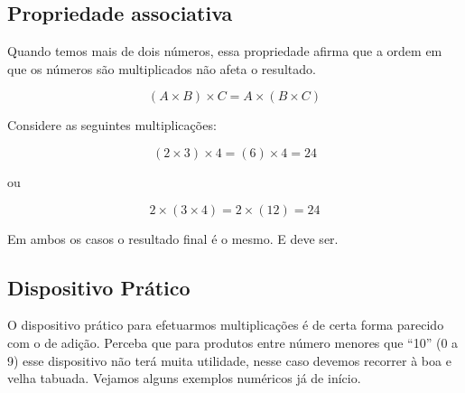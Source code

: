 \subsection{Propriedade associativa}

Quando temos mais de dois números, essa propriedade afirma que a ordem em que os números são multiplicados não afeta o resultado. 

\begin{equation}
    (A\times B)\times C=A \times (B \times C)
\end{equation}

\begin{exemplo}
    Considere as seguintes multiplicações:

    \begin{equation}
        (2\times3)\times4=(6)\times4=24
    \end{equation}
    
    ou
    
    \begin{equation}
        2\times(3\times4)=2\times(12)=24
    \end{equation}

    Em ambos os casos o resultado final é o mesmo. E deve ser.
\end{exemplo}

\subsection{Dispositivo Prático}

O dispositivo prático para efetuarmos multiplicações é de certa forma parecido com o de adição. Perceba que para produtos entre número menores que “10” (0 a 9) esse dispositivo não terá muita utilidade, nesse caso devemos recorrer à boa e velha tabuada. Vejamos alguns exemplos numéricos já de início.

